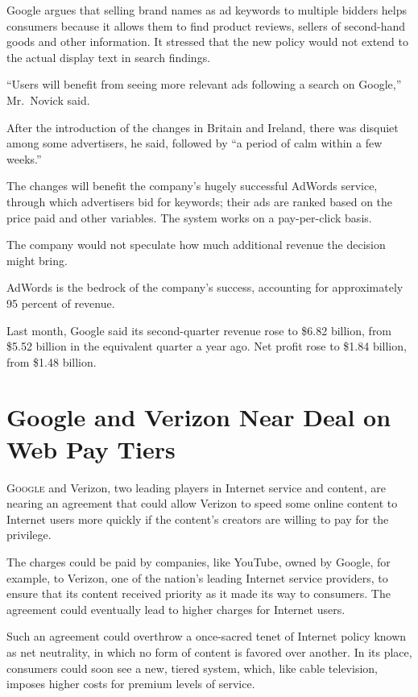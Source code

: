 ﻿\documentclass[12pt]{article}
\begin{document}
Google argues that selling brand names as ad keywords to multiple bidders helps consumers because it
allows them to find product reviews, sellers of second-hand goods and other information. It stressed
that the new policy would not extend to the actual display text in search findings.

``Users will benefit from seeing more relevant ads following a search on Google,'' Mr.~Novick said.

After the introduction of the changes in Britain and Ireland, there was disquiet among some
advertisers, he said, followed by ``a period of calm within a few weeks.''

The changes will benefit the company's hugely successful AdWords service, through which advertisers
bid for keywords; their ads are ranked based on the price paid and other variables. The system works
on a pay-per-click basis.

The company would not speculate how much additional revenue the decision might bring.

AdWords is the bedrock of the company's success, accounting for approximately 95 percent of revenue.

Last month, Google said its second-quarter revenue rose to \$6.82 billion, from \$5.52 billion in
the equivalent quarter a year ago. Net profit rose to \$1.84 billion, from \$1.48 billion.

\section{Google and Verizon Near Deal on Web Pay Tiers}

\lettrine{G}{oogle} and Verizon, two leading players in Internet service and
content, are nearing an agreement that could allow Verizon to speed some online content to Internet
users more quickly if the content's creators are willing to pay for the privilege.

The charges could be paid by companies, like YouTube, owned by Google, for example, to Verizon, one
of the nation's leading Internet service providers, to ensure that its content received priority as
it made its way to consumers. The agreement could eventually lead to higher charges for Internet
users.

Such an agreement could overthrow a once-sacred tenet of Internet policy known as net neutrality, in
which no form of content is favored over another. In its place, consumers could soon see a new,
tiered system, which, like cable television, imposes higher costs for premium levels of service.
\end{document}
